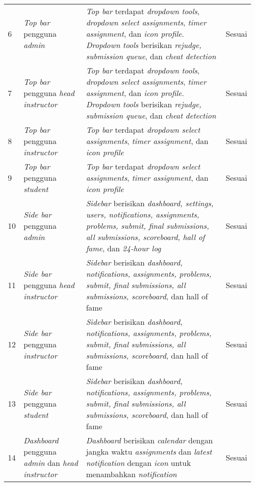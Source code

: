 \begin{longtable}[H]{|p{0.5cm}| p{5.5cm}| p{6cm}| p{2.5cm}|}
6 & \textit{Top bar} pengguna \textit{admin} & \textit{Top bar} terdapat \textit{dropdown tools}, \textit{dropdown select assignments}, \textit{timer assignment}, dan \textit{icon profile}. \textit{Dropdown tools} berisikan \textit{rejudge, submission queue}, dan \textit{cheat detection} & Sesuai\\ \cline{1-4}
7 & \textit{Top bar} pengguna \textit{head instructor} & \textit{Top bar} terdapat \textit{dropdown tools}, \textit{dropdown select assignments}, \textit{timer assignment}, dan \textit{icon profile}. \textit{Dropdown tools} berisikan \textit{rejudge, submission queue}, dan \textit{cheat detection} & Sesuai\\ \cline{1-4}
8 & \textit{Top bar} pengguna \textit{instructor} & \textit{Top bar} terdapat \textit{dropdown select assignments}, \textit{timer assignment}, dan \textit{icon profile} & Sesuai\\ \cline{1-4}
9 & \textit{Top bar} pengguna \textit{student} & \textit{Top bar} terdapat \textit{dropdown select assignments}, \textit{timer assignment}, dan \textit{icon profile} & Sesuai\\ \cline{1-4}
10 & \textit{Side bar} pengguna \textit{admin} & \textit{Sidebar} berisikan \textit{dashboard, settings, users, notifications, assignments, problems, submit, final submissions, all submissions, scoreboard, hall of fame}, dan \textit{24-hour log} & Sesuai\\ \cline{1-4}
11 & \textit{Side bar} pengguna \textit{head instructor} & \textit{Sidebar} berisikan \textit{dashboard, notifications, assignments, problems, submit, final submissions, all submissions, scoreboard}, dan hall of fame & Sesuai\\ \cline{1-4}
12 & \textit{Side bar} pengguna \textit{instructor} & \textit{Sidebar} berisikan \textit{dashboard, notifications, assignments, problems, submit, final submissions, all submissions, scoreboard}, dan hall of fame & Sesuai\\ \cline{1-4}
13 & \textit{Side bar} pengguna \textit{student} & \textit{Sidebar} berisikan \textit{dashboard, notifications, assignments, problems, submit, final submissions, all submissions, scoreboard}, dan hall of fame & Sesuai\\ \cline{1-4}
14 & \textit{Dashboard} pengguna \textit{admin} dan \textit{head instructor} & \textit{Dashboard} berisikan \textit{calendar} dengan jangka waktu \textit{assignments} dan \textit{latest notification} dengan \textit{icon} untuk menambahkan \textit{notification} & Sesuai\\ \cline{1-4}

\end{longtable}
